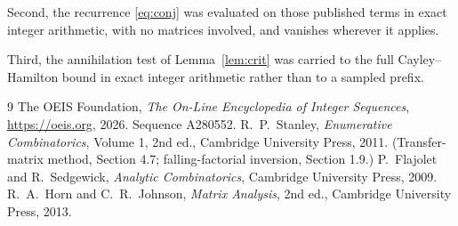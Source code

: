 \documentclass[11pt,a4paper]{article}
\theoremstyle{plain}
\theoremstyle{definition}
\begin{document}
Second, the recurrence \eqref{eq:conj} was evaluated on those published terms in exact
integer arithmetic, with no matrices involved, and vanishes wherever it applies.

Third, the annihilation test of Lemma~\ref{lem:crit} was carried to the full
Cayley--Hamilton bound in exact integer arithmetic rather than to a sampled prefix.

\begin{thebibliography}{9}
 The OEIS Foundation, \emph{The On-Line Encyclopedia of Integer
Sequences}, \url{https://oeis.org}, 2026. Sequence A280552.
 R.~P.~Stanley, \emph{Enumerative Combinatorics}, Volume 1, 2nd ed.,
Cambridge University Press, 2011. (Transfer-matrix method, Section 4.7; falling-factorial
inversion, Section 1.9.)
 P.~Flajolet and R.~Sedgewick, \emph{Analytic Combinatorics}, Cambridge
University Press, 2009.
 R.~A.~Horn and C.~R.~Johnson, \emph{Matrix Analysis}, 2nd ed., Cambridge
University Press, 2013.
\end{thebibliography}
\end{document}
